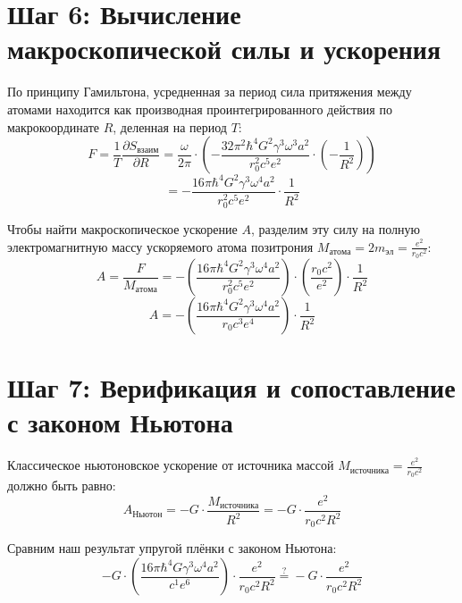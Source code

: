 \documentclass[12pt,a4paper]{article}
\begin{document}
\section*{Шаг 6: Вычисление макроскопической силы и ускорения}

По принципу Гамильтона, усредненная за период сила притяжения между атомами находится как производная проинтегрированного действия по макрокоординате $R$, деленная на период $T$:
\begin{equation}
F = \frac{1}{T} \frac{\partial S_{взаим}}{\partial R} = \frac{\omega}{2\pi} \cdot \left( - \frac{32\pi^2 \hbar^4 G^2 \gamma^3 \omega^3 a^2}{r_0^2 c^5 e^2} \cdot \left(-\frac{1}{R^2}\right) \right)
\end{equation}
\begin{equation}
= - \frac{16\pi \hbar^4 G^2 \gamma^3 \omega^4 a^2}{r_0^2 c^5 e^2} \cdot \frac{1}{R^2}
\end{equation}

Чтобы найти макроскопическое ускорение $A$, разделим эту силу на полную электромагнитную массу ускоряемого атома позитрония $M_{атома} = 2 m_{эл} = \frac{e^2}{r_0 c^2}$:
\begin{equation}
A = \frac{F}{M_{атома}} = - \left( \frac{16\pi \hbar^4 G^2 \gamma^3 \omega^4 a^2}{r_0^2 c^5 e^2} \right) \cdot \left( \frac{r_0 c^2}{e^2} \right) \cdot \frac{1}{R^2}
\end{equation}
\begin{equation}
A = - \left( \frac{16\pi \hbar^4 G^2 \gamma^3 \omega^4 a^2}{r_0 c^3 e^4} \right) \cdot \frac{1}{R^2}
\end{equation}

\section*{Шаг 7: Верификация и сопоставление с законом Ньютона}

Классическое ньютоновское ускорение от источника массой $M_{источника} = \frac{e^2}{r_0 c^2}$ должно быть равно:
\begin{equation}
A_{Ньютон} = - G \cdot \frac{M_{источника}}{R^2} = - G \cdot \frac{e^2}{r_0 c^2 R^2}
\end{equation}

Сравним наш результат упругой плёнки с законом Ньютона:
\begin{equation}
- G \cdot \left( \frac{16\pi \hbar^4 G \gamma^3 \omega^4 a^2}{c^1 e^6} \right) \cdot \frac{e^2}{r_0 c^2 R^2} \stackrel{?}{=} - G \cdot \frac{e^2}{r_0 c^2 R^2}
\end{equation}
\end{document}
